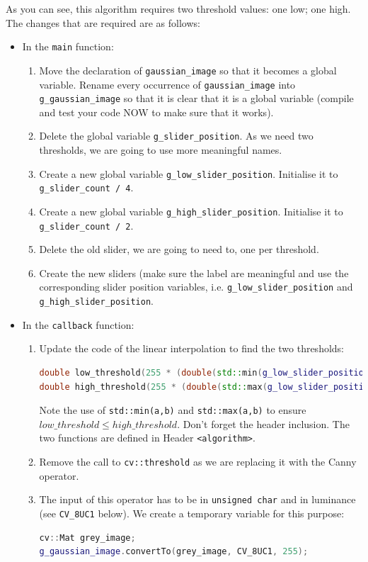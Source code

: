 \documentclass[english,a4paper,12pt,oneside]{article}
\begin{document}
As you can see, this algorithm requires two threshold values: one low; one high. 
The changes that are required are as follows:
\begin{itemize}
\item In the \verb+main+ function:
    \begin{enumerate}
    \item Move the declaration of \verb+gaussian_image+ so that it becomes a global variable. Rename every occurrence of \verb+gaussian_image+ into \verb+g_gaussian_image+ so that it is clear that it is a global variable (compile and test your code NOW to make sure that it works). 
    \item Delete the global variable \verb+g_slider_position+. As we need two thresholds, we are going to use more meaningful names.
    \item Create a new global variable \verb+g_low_slider_position+. Initialise it to \verb+g_slider_count / 4+.
    \item Create a new global variable \verb+g_high_slider_position+. Initialise it to \verb+g_slider_count / 2+.
    \item Delete the old slider, we are going to need to, one per threshold. 
    \item Create the new sliders (make sure the label are meaningful and use the corresponding slider position variables, i.e. \verb+g_low_slider_position+ and \verb+g_high_slider_position+.
    \end{enumerate}
    \item In the \verb+callback+ function:
        \begin{enumerate}
        \item Update the code of the linear interpolation to find the two thresholds:
         \begin{lstlisting}[language=c++]
double low_threshold(255 * (double(std::min(g_low_slider_position,   g_high_slider_position) / double(g_slider_count))));
double high_threshold(255 * (double(std::max(g_low_slider_position, g_high_slider_position) / double(g_slider_count))));
	\end{lstlisting}
	Note the use of \verb+std::min(a,b)+ and \verb+std::max(a,b)+  to ensure 
	$low\_threshold \leq high\_threshold$. Don't forget the header inclusion. The two functions are defined in Header \verb+<algorithm>+.
	\item Remove the call to \verb+cv::threshold+ as we are replacing it with the Canny operator.
	\item The input of this operator has to be in \verb+unsigned char+ and in luminance (see \verb+CV_8UC1+ below). We create a temporary variable for this purpose:
         \begin{lstlisting}[language=c++]
cv::Mat grey_image;
g_gaussian_image.convertTo(grey_image, CV_8UC1, 255);
	\end{lstlisting}


\end{enumerate}
\end{itemize}
\end{document}
